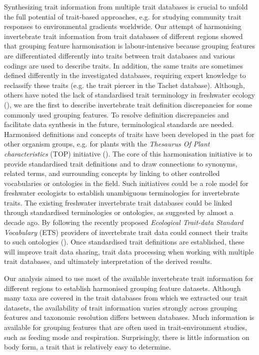 \documentclass{article}
\begin{document}
Synthesizing trait information from multiple trait databases is crucial to unfold the full potential of trait-based approaches, e.g. for studying community trait responses to environmental gradients worldwide. Our attempt of harmonising invertebrate trait information from trait databases of different regions showed that grouping feature harmonisation is labour-intensive because grouping features are differentiated differently into traits between trait databases and various codings are used to describe traits. In addition, the same traits are sometimes defined differently in the investigated databases, requiring expert knowledge to reclassify these traits (e.g. the trait piercer in the Tachet database). Although, others have noted the lack of standardised trait terminology in freshwater ecology (\cite{baird_toward_2011, brink_traits-based_2011}), we are the first to describe invertebrate trait definition discrepancies for some commonly used grouping features. To resolve definition discrepancies and facilitate data synthesis in the future, terminological standards are needed. Harmonised definitions and concepts of traits have been developed in the past for other organism groups, e.g. for plants with the \textit{Thesaurus Of Plant characteristics} (TOP) initiative (\cite{garnier_towards_2017}). The core of this harmonisation initiative is to provide standardised trait definitions and to draw connections to synonyms, related terms, and surrounding concepts by linking to other controlled vocabularies or ontologies in the field. Such initiatives could be a role model for freshwater ecologists to establish unambiguous terminologies for invertebrate traits. The existing freshwater invertebrate trait databases could be linked through standardised terminologies or ontologies, as suggested by \citet{baird_toward_2011} almost a decade ago. By following the recently proposed \textit{Ecological Trait-data Standard Vocabulary} (ETS) providers of invertebrate trait data could connect their traits to such ontologies (\cite{schneider_towards_2019}). Once standardised trait definitions are established, these will improve trait data sharing, trait data processing when working with multiple trait databases, and ultimately interpretation of the derived results. 

Our analysis aimed to use most of the available invertebrate trait information for different regions to establish harmonised grouping feature datasets. Although many taxa are covered in the trait databases from which we extracted our trait datasets, the availability of trait information varies strongly across grouping features and taxonomic resolution differs between databases. Much information is available for grouping features that are often used in trait-environment studies, such as feeding mode and respiration. Surprisingly, there is little information on body form, a trait that is relatively easy to determine. 
\end{document}

